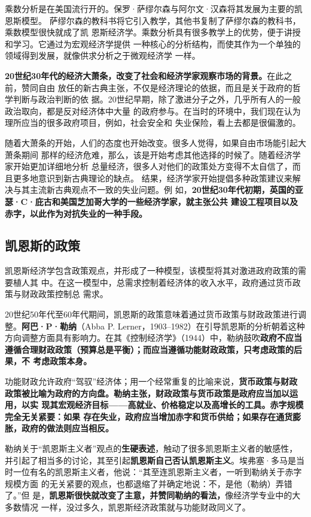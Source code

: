 乘数分析是在美国流行开的。保罗·萨缪尔森与阿尔文·汉森将其发展为主要的凯恩斯模型。
萨缪尔森的教科书将它引入教学，其他书复制了萨缪尔森的教科书，乘数模型很快就成了凯
恩斯经济学。乘数分析具有很多教学上的优势，便于讲授和学习。它通过为宏观经济学提供
一种核心的分析结构，而使其作为一个单独的领域得到发展，就像供求分析之于微观经济学
一样。

\textbf{20世纪30年代的经济大萧条，改变了社会和经济学家观察市场的背景。}在此之前，赞同自由
放任的新古典主张，不仅是经济理论的依据，而且是关于政府的哲学判断与政治判断的依
据。20世纪早期，除了激进分子之外，几乎所有人的一般政治取向，都是反对经济体中大量
的政府参与。在当时的环境中，我们现在认为理所应当的很多政府项目，例如，社会安全和
失业保险，看上去都是很偏激的。

随着大萧条的开始，人们的态度也开始改变。很多人觉得，如果自由市场能引起大萧条期间
那样的经济危难，那么，该是开始考虑其他选择的时候了。随着经济学家开始更加详细地分析
总量经济，很多人对他们的政策处方变得不太自信了，而且更多地意识到新古典理论的缺点。
结果，经济学家开始提倡多种政策建议来解决与其主流新古典观点不一致的失业问题。例
如，\textbf{20世纪30年代初期，英国的亚瑟·C·庇古和美国芝加哥大学的一些经济学家，就主张公共
建设工程项目以及赤字，以此作为对抗失业的一种手段。}

\subsection{凯恩斯的政策}

凯恩斯经济学包含政策观点，并形成了一种模型，该模型将其对激进政府政策的需要植人其
中。在这一模型中，总需求控制着经济体的收入水平，政府通过货币政策与财政政策控制总
需求。

20世纪50年代至60年代期间，凯恩斯的政策意味着通过货币政策与财政政策进行调
整。\textbf{阿巴·P·勒纳}（Abba P. Lerner，1903--1982）在引导凯恩斯的分析朝着这种
方向调整方面具有影响力。在其《控制经济学》（1944）中，勒纳鼓吹\textbf{政府不应当
  遵循合理财政政策（预算总是平衡）；而应当遵循功能财政政策，只考虑政策的后果，不
  考虑政策本身。}

功能财政允许政府“驾驭”经济体；用一个经常重复的比喻来说，\textbf{货币政策与财政
  政策被比喻为政府的方向盘。勒纳主张，财政政策与货币政策是政府应当加以运用，以实
  现其宏观经济目标——高就业、价格稳定以及高增长的工具。赤字规模完全无关紧要：如果
  存在失业，政府应当增加赤字和货币供给；如果存在通货膨胀，政府的做法则应当相反。}

勒纳关于“凯恩斯主义者”观点的\textbf{生硬表述}，触动了很多凯恩斯主义者的敏感性，
并引起了相当多的讨论，其至引起\textbf{凯恩斯自己否认凯恩斯主义}。埃弗塞·多马是当
时一位有名的凯恩斯主义者，他说：“其至连凯恩斯主义者，一听到勒纳关于赤字规模方面
的无关紧要的观点，也都退缩了并确定地说：不，是他（勒纳）弄错了。”但
是，\textbf{凯恩斯很快就改变了主意，并赞同勒纳的看法，}像经济学专业中的大多数情况
一样，没过多久，凯恩斯经济政策就与功能财政同义了。

